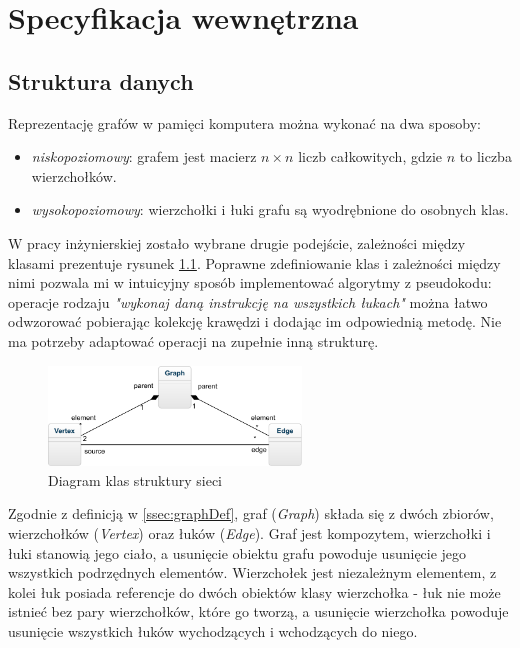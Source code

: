 \chapter{Specyfikacja wewnętrzna}\label{chp:specWew}
\section{Struktura danych}
Reprezentację grafów w pamięci komputera można wykonać na dwa sposoby:
\begin{itemize}
	\item \textit{niskopoziomowy}: grafem jest macierz $ n\times n $ liczb całkowitych, gdzie $ n $ to liczba wierzchołków.\cite{id:AlgorytmyStruktury}
	\item \textit{wysokopoziomowy}: wierzchołki i łuki grafu są wyodrębnione do osobnych klas.
\end{itemize}
W pracy inżynierskiej zostało wybrane drugie podejście, zależności między klasami prezentuje rysunek \ref{fig:graphStructure}. Poprawne zdefiniowanie klas i zależności między nimi pozwala mi w intuicyjny sposób implementować algorytmy z pseudokodu: operacje rodzaju \textit{"wykonaj daną instrukcję na wszystkich łukach"} można łatwo odwzorować pobierając kolekcję krawędzi i dodając im odpowiednią metodę. Nie ma potrzeby adaptować operacji na zupełnie inną strukturę.
\begin{figure}[H]
	\centering
	\includegraphics[width=0.6\textwidth]{./img/dane}
	\caption{Diagram klas struktury sieci}
	\label{fig:graphStructure}
\end{figure}
Zgodnie z definicją w \ref{ssec:graphDef}, graf (\emph{Graph}) składa się z dwóch zbiorów, wierzchołków (\emph{Vertex}) oraz łuków (\emph{Edge}). Graf jest kompozytem, wierzchołki i łuki stanowią jego ciało, a usunięcie obiektu grafu powoduje usunięcie jego wszystkich podrzędnych elementów. Wierzchołek jest niezależnym elementem, z kolei łuk posiada referencje do dwóch obiektów klasy wierzchołka - łuk nie może istnieć bez pary wierzchołków, które go tworzą, a usunięcie wierzchołka powoduje usunięcie wszystkich łuków wychodzących i wchodzących do niego.

